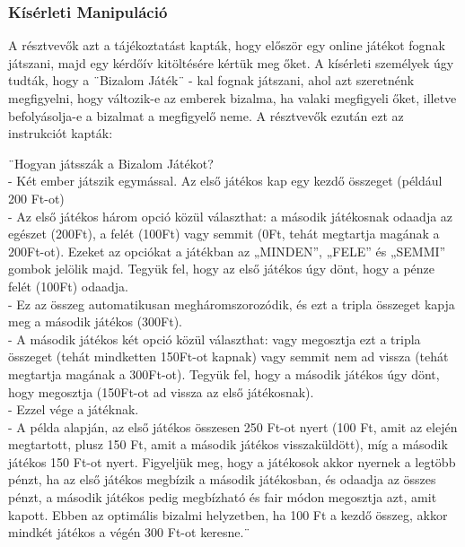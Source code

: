 \subsubsection{Kísérleti Manipuláció}
A résztvevők azt a tájékoztatást kapták, hogy először egy online játékot fognak játszani, majd egy kérdőív kitöltésére kértük meg őket. A kísérleti személyek úgy tudták, hogy a ¨Bizalom Játék¨ - kal \parencite{szekeres_halperin_kende_saguy} fognak játszani, ahol azt szeretnénk megfigyelni, hogy változik-e az emberek bizalma, ha valaki megfigyeli őket, illetve befolyásolja-e a bizalmat a megfigyelő neme. A résztvevők ezután ezt az instrukciót kapták:
\begin{quoting}[\itshape]
	¨Hogyan játsszák a Bizalom Játékot? \\
	- Két ember játszik egymással. Az első játékos kap egy kezdő összeget (például 200 Ft-ot) \\
	- Az első játékos három opció közül választhat: a második játékosnak odaadja az egészet
	(200Ft), a felét (100Ft) vagy semmit (0Ft, tehát megtartja magának a 200Ft-ot). Ezeket az
	opciókat a játékban az „MINDEN”, „FELE” és „SEMMI” gombok jelölik majd. Tegyük fel, hogy az első játékos úgy dönt, hogy a pénze felét (100Ft) odaadja. \\
	- Ez az összeg automatikusan megháromszorozódik, és ezt a tripla összeget kapja meg a második játékos (300Ft). \\
	- A második játékos két opció közül választhat: vagy megosztja ezt a tripla összeget (tehát mindketten 150Ft-ot kapnak) vagy semmit nem ad vissza (tehát megtartja magának a 300Ft-ot). Tegyük fel, hogy a második játékos úgy dönt, hogy megosztja (150Ft-ot ad vissza az első játékosnak). \\
	- Ezzel vége a játéknak. \\
	- A példa alapján, az első játékos összesen 250 Ft-ot nyert (100 Ft, amit az elején megtartott, 
	plusz 150 Ft, amit a második játékos visszaküldött), míg a második játékos 150 Ft-ot nyert.
	Figyeljük meg, hogy a játékosok akkor nyernek a legtöbb pénzt, ha az első játékos megbízik a második játékosban, és odaadja az összes pénzt, a második játékos pedig megbízható és fair módon megosztja azt, amit kapott. Ebben az optimális bizalmi helyzetben, ha 100 Ft a kezdő összeg, akkor mindkét játékos a végén 300 Ft-ot keresne.¨
\end{quoting}

